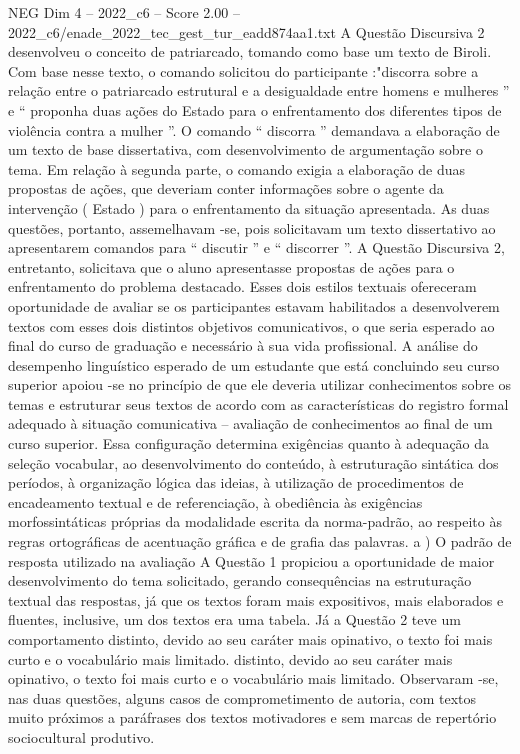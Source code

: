 \begin{textsample}{NEG Dim 4 – 2022\_c6 – Score 2.00 – 2022\_c6/enade\_2022\_tec\_gest\_tur\_eadd874aa1.txt}
A Questão Discursiva 2 desenvolveu o conceito de patriarcado, tomando como base um texto de Biroli.
Com base nesse texto, o comando solicitou do participante :"discorra sobre a relação entre o patriarcado estrutural e a desigualdade entre homens e mulheres ” e “ proponha duas ações do Estado para o enfrentamento dos diferentes tipos de violência contra a mulher ”.
O comando “ discorra ” demandava a elaboração de um texto de base dissertativa, com desenvolvimento de argumentação sobre o tema.
Em relação à segunda parte, o comando exigia a elaboração de duas propostas de ações, que deveriam conter informações sobre o agente da intervenção ( Estado ) para o enfrentamento da situação apresentada.
As duas questões, portanto, assemelhavam -se, pois solicitavam um texto dissertativo ao apresentarem comandos para “ discutir ” e “ discorrer ”.
A Questão Discursiva 2, entretanto, solicitava que o aluno apresentasse propostas de ações para o enfrentamento do problema destacado.
Esses dois estilos textuais ofereceram oportunidade de avaliar se os participantes estavam habilitados a desenvolverem textos com esses dois distintos objetivos comunicativos, o que seria esperado ao final do curso de graduação e necessário à sua vida profissional.
A análise do desempenho linguístico esperado de um estudante que está concluindo seu curso superior apoiou -se no princípio de que ele deveria utilizar conhecimentos sobre os temas e estruturar seus textos de acordo com as características do registro formal adequado à situação comunicativa – avaliação de conhecimentos ao final de um curso superior.
Essa configuração determina exigências quanto à adequação da seleção vocabular, ao desenvolvimento do conteúdo, à estruturação sintática dos períodos, à organização lógica das ideias, à utilização de procedimentos de encadeamento textual e de referenciação, à obediência às exigências morfossintáticas próprias da modalidade escrita da norma-padrão, ao respeito às regras ortográficas de acentuação gráfica e de grafia das palavras. a ) O padrão de resposta utilizado na avaliação A Questão 1 propiciou a oportunidade de maior desenvolvimento do tema solicitado, gerando consequências na estruturação textual das respostas, já que os textos foram mais expositivos, mais elaborados e fluentes, inclusive, um dos textos era uma tabela.
Já a Questão 2 teve um comportamento distinto, devido ao seu caráter mais opinativo, o texto foi mais curto e o vocabulário mais limitado. distinto, devido ao seu caráter mais opinativo, o texto foi mais curto e o vocabulário mais limitado.
Observaram -se, nas duas questões, alguns casos de comprometimento de autoria, com textos muito próximos a paráfrases dos textos motivadores e sem marcas de repertório sociocultural produtivo.

\end{textsample}
